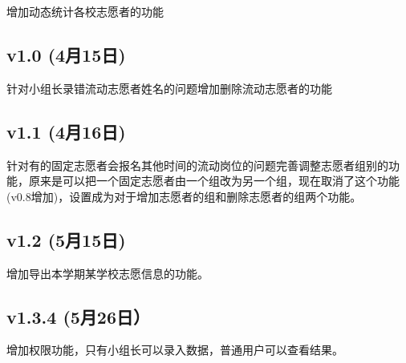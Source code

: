 \documentclass[]{ctexart}
\begin{document}
增加动态统计各校志愿者的功能
\hypertarget{v1.0-4ux670815ux65e5}{%
\subsection{v1.0 (4月15日)}\label{v1.0-4ux670815ux65e5}}

针对小组长录错流动志愿者姓名的问题增加删除流动志愿者的功能

\hypertarget{v1.1-4ux670816ux65e5}{%
\subsection{v1.1 (4月16日)}\label{v1.1-4ux670816ux65e5}}

针对有的固定志愿者会报名其他时间的流动岗位的问题完善调整志愿者组别的功能，原来是可以把一个固定志愿者由一个组改为另一个组，现在取消了这个功能(v0.8增加)，设置成为对于增加志愿者的组和删除志愿者的组两个功能。

\hypertarget{v1.2-5ux670815ux65e5}{%
\subsection{v1.2 (5月15日)}\label{v1.2-5ux670815ux65e5}}

增加导出本学期某学校志愿信息的功能。

\hypertarget{v1.3.4-5ux670826ux65e5}{%
\subsection{v1.3.4 (5月26日）}\label{v1.3.4-5ux670826ux65e5}}

增加权限功能，只有小组长可以录入数据，普通用户可以查看结果。
\end{document}

